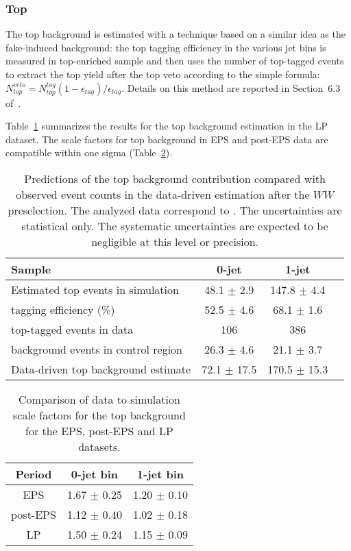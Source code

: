 \subsubsection{Top}

The top background is estimated with a technique based on a similar idea as the fake-induced background:
the top tagging efficiency in the various jet bins is measured in top-enriched sample and then uses the number of top-tagged events to extract the top yield
after the top veto according to the simple formula: $N_{top}^{veto}=N_{top}^{tag}(1-\epsilon_{tag})/\epsilon_{tag}$.
Details on this method are reported in Section~6.3 of~\cite{epsnote}.

Table~\ref{tab:lp_ttbar_est} summarizes the results for the top background estimation in the LP dataset. 
The scale factors for top background in EPS and post-EPS data are compatible within one sigma (Table~\ref{tab:lp_periods_top}).

\begin{table}[!htbp]
\begin{center}
\begin{tabular}{l c c c}
\hline
Sample                                        &   0-jet          & 1-jet          \\
\hline
Estimated top events in simulation  	      &  48.1 $\pm$ 2.9  & 147.8 $\pm$ 4.4 \\
tagging efficiency (\%)                       &  52.5 $\pm$ 4.6  &  68.1 $\pm$ 1.6 \\
top-tagged events in data           	      &          106     &    386          \\
background events in control region           &  26.3 $\pm$ 4.6  &  21.1 $\pm$ 3.7 \\
Data-driven top background estimate           &  72.1 $\pm$ 17.5 & 170.5 $\pm$ 15.3\\
\hline
\end{tabular}
\caption{Predictions of the top background contribution compared 
with observed event counts in the data-driven estimation after the $WW$ preselection. 
The analyzed data correspond to \lpintlumi.
The uncertainties are statistical only. The systematic uncertainties are expected to be 
negligible at this level or precision.}
\label{tab:lp_ttbar_est}
\end{center}
\end{table}

\begin{table}[!htbp]
\begin{center}
\begin{tabular}{c c c} 
\hline
Period & 0-jet bin & 1-jet bin \\ 
\hline
EPS      & 1.67 $\pm$ 0.25 & 1.20 $\pm$ 0.10 \\
post-EPS & 1.12 $\pm$ 0.40 & 1.02 $\pm$ 0.18 \\
LP       & 1.50 $\pm$ 0.24 & 1.15 $\pm$ 0.09 \\
\hline
\end{tabular}
\caption{Comparison of data to simulation scale factors for the top background for the EPS, post-EPS and LP datasets.}
\label{tab:lp_periods_top}
\end{center}
\end{table}

